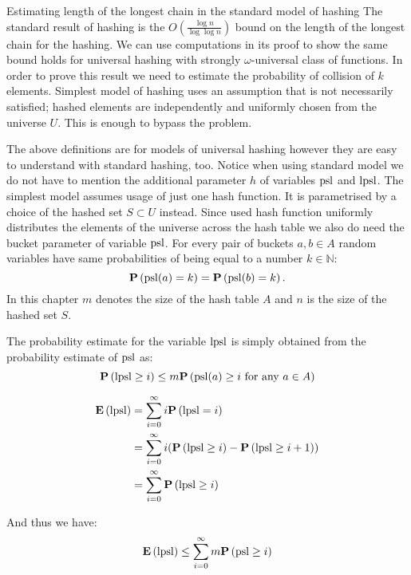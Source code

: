 \begin{section}{Estimating length of the longest chain in the standard model of hashing}
The standard result of hashing is the $O\left(\frac{\log n}{\log \log n}\right)$ bound on the length of the longest chain for the hashing. We can use computations in its proof to show the same bound holds for universal hashing with strongly $\omega$-universal class of functions. In order to prove this result we need to estimate the probability of collision of $k$ elements. Simplest model of hashing uses an assumption that is not necessarily satisfied; hashed elements are independently and uniformly chosen from the universe $U$. This is enough to bypass the problem. 

The above definitions are for models of universal hashing however they are easy to understand with standard hashing, too. Notice when using standard model we do not have to mention the additional parameter $h$ of variables $\mathrm{psl}$ and $\mathrm{lpsl}$. The simplest model assumes usage of just one hash function. It is parametrised by a choice of the hashed set $S \subset U$ instead. Since used hash function uniformly distributes the elements of the universe across the hash table we also do need the bucket parameter of variable $\mathrm{psl}$. For every pair of buckets $a, b \in A$ random variables have same probabilities of being equal to a number $k \in \mathbb{N}$: \[\mathbf{P}\left(\mathrm{psl}(a) = k\right) = \mathbf{P}\left(\mathrm{psl}(b) = k\right) \text{.}\] In this chapter $m$ denotes the size of the hash table $A$ and $n$ is the size of the hashed set $S$.

The probability estimate for the variable $\mathrm{lpsl}$ is simply obtained from the probability estimate of $\mathrm{psl}$ as:
\begin{displaymath}
\mathbf{P}\left(\mathrm{lpsl} \geq i\right) \leq m \mathbf{P}\left(\mathrm{psl}(a) \geq i \text{ for any } a \in A\right)
\end{displaymath}

\begin{displaymath}
\begin{split}
\mathbf{E}\left(\mathrm{lpsl}\right)
	& = \displaystyle \sum_{i=0}^{\infty} i \mathbf{P}\left(\mathrm{lpsl} = i\right) \\
	& = \displaystyle \sum_{i = 0}^{\infty} i (\mathbf{P}\left(\mathrm{lpsl} \geq i\right) - \mathbf{P}\left(\mathrm{lpsl} \geq i + 1\right)) \\ 
	& = \displaystyle \sum_{i = 0}^{\infty} \mathbf{P}\left(\mathrm{lpsl} \geq i\right)
\end{split}
\end{displaymath}

And thus we have:
\begin{displaymath}
\mathbf{E}\left(\mathrm{lpsl}\right) \leq \displaystyle \sum_{i = 0}^{\infty} m \mathbf{P}\left(\mathrm{psl} \geq i\right)
\end{displaymath}


\end{section}
